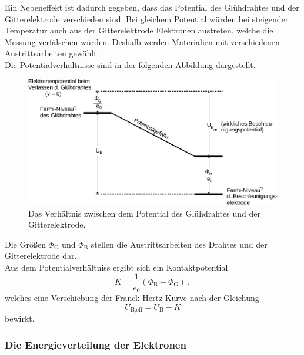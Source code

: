     Ein Nebeneffekt ist dadurch gegeben,
    dass das Potential des Glühdrahtes und der Gitterelektrode verschieden sind.
    Bei gleichem Potential würden bei steigender Temperatur auch aus der Gitterelektrode Elektronen austreten,
    welche die Messung verfälschen würden.
    Deshalb werden Materialien mit verschiedenen Austrittsarbeiten gewählt.\\
    Die Potentialverhältnisse sind in der folgenden Abbildung dargestellt.
    \begin{figure}[H]
        \centering
        \includegraphics[scale=0.7]{content/img/Abb_3.pdf}
        \caption{Das Verhältnis zwischen dem Potential des Glühdrahtes und der Gitterelektrode.}
        \label{fig:potentialverhältnisse}
    \end{figure}
    Die Größen $\Phi_\text{G}$ und $\Phi_\text{B}$ stellen die Austrittsarbeiten des Drahtes und der Gitterelektrode dar.\\
    Aus dem Potentialverhältniss ergibt sich ein Kontaktpotential
    \begin{equation*}
        K = \frac{1}{e_0} (\Phi_\text{B} - \Phi_\text{G}) \ ,
    \end{equation*}
    welches eine Verschiebung der Franck-Hertz-Kurve nach der Gleichung
    \begin{equation*}
        U_\text{B,eff} = U_\text{B} - K
    \end{equation*}
    bewirkt.

\subsubsection{Die Energieverteilung der Elektronen}
\label{fig:energieverteilung}

